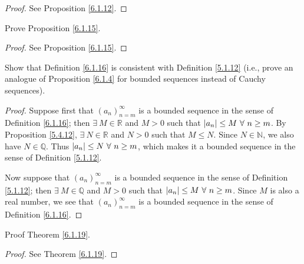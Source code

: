 \begin{proof}
See Proposition \ref{6.1.12}.
\end{proof}

\begin{exercise}\label{ex 6.1.6}
Prove Proposition \ref{6.1.15}.
\end{exercise}

\begin{proof}
See Proposition \ref{6.1.15}.
\end{proof}

\begin{exercise}\label{ex 6.1.7}
Show that Definition \ref{6.1.16} is consistent with Definition \ref{5.1.12}
(i.e., prove an analogue of Proposition \ref{6.1.4} for bounded sequences instead of Cauchy sequences).
\end{exercise}

\begin{proof}
Suppose first that \((a_n)_{n = m}^\infty\) is a bounded sequence in the sense of Definition \ref{6.1.16};
then \(\exists\ M \in \mathds{R}\) and \(M > 0\) such that \(\abs*{a_n} \leq M \ \forall\ n \geq m\).
By Proposition \ref{5.4.12}, \(\exists\ N \in \mathds{R}\) and \(N > 0\) such that \(M \leq N\).
Since \(N \in \mathds{N}\), we also have \(N \in \mathds{Q}\).
Thus \(\abs*{a_n} \leq N \ \forall\ n \geq m\), which makes it a bounded sequence in the sense of Definition \ref{5.1.12}.

Now suppose that \((a_n)_{n = m}^\infty\) is a bounded sequence in the sense of Definition \ref{5.1.12};
then \(\exists\ M \in \mathds{Q}\) and \(M > 0\) such that \(\abs*{a_n} \leq M \ \forall\ n \geq m\).
Since \(M\) is also a real number, we see that \((a_n)_{n = m}^\infty\) is a bounded sequence in the sense of Definition \ref{6.1.16}.
\end{proof}

\begin{exercise}\label{ex 6.1.8}
Proof Theorem \ref{6.1.19}.
\end{exercise}

\begin{proof}
See Theorem \ref{6.1.19}.
\end{proof}